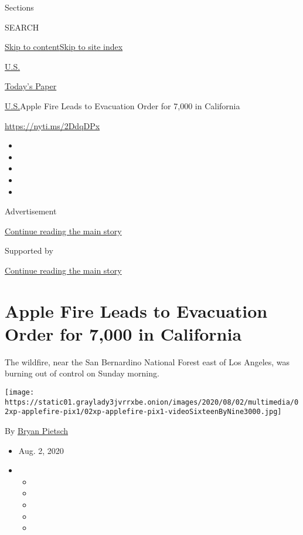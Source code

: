 Sections

SEARCH

\protect\hyperlink{site-content}{Skip to
content}\protect\hyperlink{site-index}{Skip to site index}

\href{https://www.nytimes3xbfgragh.onion/section/us}{U.S.}

\href{https://myaccount.nytimes3xbfgragh.onion/auth/login?response_type=cookie\&client_id=vi}{}

\href{https://www.nytimes3xbfgragh.onion/section/todayspaper}{Today's
Paper}

\href{/section/us}{U.S.}\textbar{}Apple Fire Leads to Evacuation Order
for 7,000 in California

\url{https://nyti.ms/2DdqDPx}

\begin{itemize}
\item
\item
\item
\item
\item
\end{itemize}

Advertisement

\protect\hyperlink{after-top}{Continue reading the main story}

Supported by

\protect\hyperlink{after-sponsor}{Continue reading the main story}

\hypertarget{apple-fire-leads-to-evacuation-order-for-7000-in-california}{%
\section{Apple Fire Leads to Evacuation Order for 7,000 in
California}\label{apple-fire-leads-to-evacuation-order-for-7000-in-california}}

The wildfire, near the San Bernardino National Forest east of Los
Angeles, was burning out of control on Sunday morning.

\texttt{[image: https://static01.graylady3jvrrxbe.onion/images/2020/08/02/multimedia/02xp-applefire-pix1/02xp-applefire-pix1-videoSixteenByNine3000.jpg]}

By \href{https://www.nytimes3xbfgragh.onion/by/bryan-pietsch}{Bryan
Pietsch}

\begin{itemize}
\item
  Aug. 2, 2020
\item
  \begin{itemize}
  \item
  \item
  \item
  \item
  \item
  \end{itemize}
\end{itemize}

